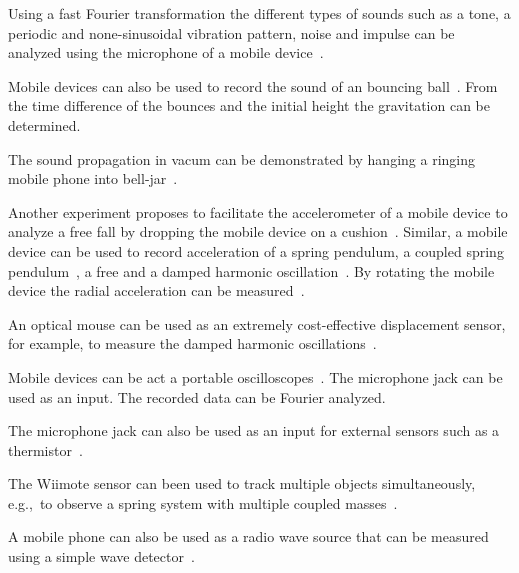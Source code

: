 \documentclass{sigchi}
\newcommand{\eg}{e.g.,\ }
\begin{document}

Using a fast Fourier transformation the different types of sounds such as a tone, a periodic and none-sinusoidal vibration pattern, noise and impulse can be analyzed using the microphone of a mobile device~\cite{KuhnAcousticPhenomena2013}.

Mobile devices can also be used to record the sound of an bouncing ball~\cite{Schwarz2013Acoustic}.
From the time difference of the bounces and the initial height the gravitation can be determined.

The sound propagation in vacum can be demonstrated by hanging a ringing mobile phone into bell-jar~\cite{CaleonBellJar2013}.



Another experiment proposes to facilitate the accelerometer of a mobile device to analyze a free fall by dropping the mobile device on a cushion~\cite{VogtFreeFall2012}.
Similar, a mobile device can be used to record acceleration of a spring pendulum, a coupled spring pendulum~\cite{KuhnPendulum2012}, a free and a damped harmonic oscillation~\cite{Castro2013}.
By rotating the mobile device the radial acceleration can be measured~\cite{VogtRadialAcc2013}.



An optical mouse can be used as an extremely cost-effective displacement sensor, for example, to measure the damped harmonic oscillations~\cite{Ng2005}.

Mobile devices can be act a portable oscilloscopes~\cite{Forinash2012}.
The microphone jack can be used as an input.
The recorded data can be Fourier analyzed.

The microphone jack can also be used as an input for external sensors such as a thermistor~\cite{Forinash2012}.

The Wiimote sensor can been used to track multiple objects simultaneously, \eg to observe a spring system with multiple coupled masses~\cite{Skeffington2012}.

A mobile phone can also be used as a radio wave source that can be measured using a simple wave detector~\cite{Hare2010}.
\end{document}
